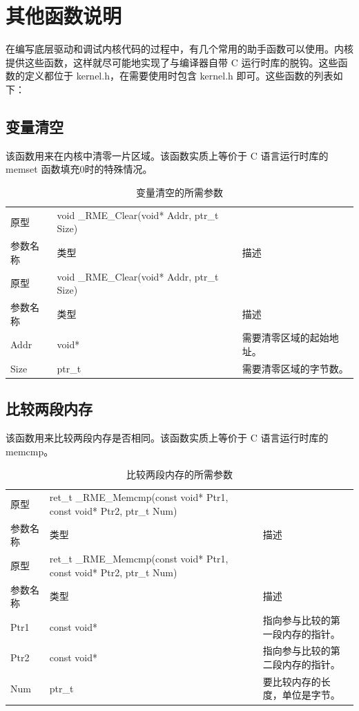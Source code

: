 \section{其他函数说明}\label{sec:7-other-function-descriptions}

在编写底层驱动和调试内核代码的过程中，有几个常用的助手函数可以使用。内核提供这些函数，这样就尽可能地实现了与编译器自带 C 运行时库的脱钩。这些函数的定义都位于 kernel.h，在需要使用时包含 kernel.h 即可。这些函数的列表如下：

\subsection{变量清空}\label{subsec:7-clear-variables}

该函数用来在内核中清零一片区域。该函数实质上等价于 C 语言运行时库的 memset 函数填充0时的特殊情况。

\begin{xltabular}{\textwidth}{@{}>{\hsize\raggedright\arraybackslash}X>{\hsize\raggedright\arraybackslash}X>{\hsize\raggedright\arraybackslash}X@{}}
\caption{变量清空的所需参数}\label{tab:7-85-clear-variables-parameters}\\
\toprule
原型 & void \_RME\_Clear(void* Addr, ptr\_t Size) &\tabularnewline
参数名称 & 类型 & 描述\tabularnewline
\endfirsthead
\toprule
原型 & void \_RME\_Clear(void* Addr, ptr\_t Size) &\tabularnewline
参数名称 & 类型 & 描述\tabularnewline
\midrule
\endhead
\bottomrule
\endlastfoot
Addr & void* & 需要清零区域的起始地址。\tabularnewline
Size & ptr\_t & 需要清零区域的字节数。\tabularnewline
\end{xltabular}

\subsection{比较两段内存}\label{subsec:7-compare-two-memory-blocks}

该函数用来比较两段内存是否相同。该函数实质上等价于 C 语言运行时库的 memcmp。

\begin{xltabular}{\textwidth}{@{}>{\hsize\raggedright\arraybackslash}X>{\hsize\raggedright\arraybackslash}X>{\hsize\raggedright\arraybackslash}X@{}}
\caption{比较两段内存的所需参数}\label{tab:7-86-compare-two-memory-blocks-parameters}\\
\toprule
原型 & ret\_t \_RME\_Memcmp(const void* Ptr1, const void* Ptr2, ptr\_t
Num) &\tabularnewline
参数名称 & 类型 & 描述\tabularnewline
\endfirsthead
\toprule
原型 & ret\_t \_RME\_Memcmp(const void* Ptr1, const void* Ptr2, ptr\_t
Num) &\tabularnewline
参数名称 & 类型 & 描述\tabularnewline
\midrule
\endhead
\bottomrule
\endlastfoot
Ptr1 & const void* & 指向参与比较的第一段内存的指针。\tabularnewline
Ptr2 & const void* & 指向参与比较的第二段内存的指针。\tabularnewline
Num & ptr\_t & 要比较内存的长度，单位是字节。\tabularnewline
\end{xltabular}

